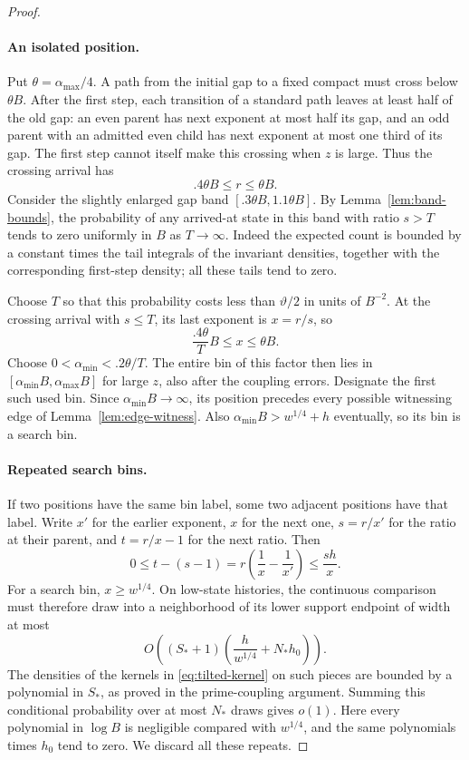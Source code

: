 \begin{proof}
\paragraph{An isolated position.}
Put $\theta=\alpha_{\max}/4$.  A path from the initial gap to a
fixed compact must cross below $\theta B$.  After the first step,
each transition of a standard path leaves at least half of the
old gap: an even parent has next exponent at most half its gap,
and an odd parent with an admitted even child has next exponent
at most one third of its gap.  The first step cannot itself make
this crossing when $z$ is large.  Thus the crossing arrival has
\[
 .4\theta B\le r\le\theta B.
\]
Consider the slightly enlarged gap band
$[.3\theta B,1.1\theta B]$.  By Lemma~\ref{lem:band-bounds}, the
probability of any arrived-at state in this band with ratio
$s>T$ tends to zero uniformly in $B$ as $T\to\infty$.
Indeed the expected count is bounded by a constant times the
tail integrals of the invariant densities, together with the
corresponding first-step density; all these tails tend to zero.

Choose $T$ so that this probability costs less than $\vartheta/2$ in
units of $B^{-2}$.  At the crossing arrival with $s\le T$, its last
exponent is $x=r/s$, so
\[
 \frac{.4\theta}{T}B\le x\le\theta B.
\]
Choose $0<\alpha_{\min}<.2\theta/T$.  The entire bin of this
factor then lies in $[\alpha_{\min}B,\alpha_{\max}B]$ for large
$z$, also after the coupling errors.  Designate the first such
used bin.  Since $\alpha_{\min}B\to\infty$, its position precedes
every possible witnessing edge of
Lemma~\ref{lem:edge-witness}.  Also
$\alpha_{\min}B>w^{1/4}+h$ eventually, so its bin is a search bin.

\paragraph{Repeated search bins.}
If two positions have the same bin label, some two adjacent
positions have that label.  Write $x'$ for the earlier exponent,
$x$ for the next one, $s=r/x'$ for the ratio at their parent, and
$t=r/x-1$ for the next ratio.  Then
\begin{equation}\label{eq:boxes-repeat-width}
 0\le t-(s-1)=r\left(\frac1x-\frac1{x'}\right)
       \le\frac{s h}{x}.
\end{equation}
For a search bin, $x\ge w^{1/4}$.  On low-state histories, the
continuous comparison must therefore draw into a neighborhood of
its lower support endpoint of width at most
\[
 O\left((S_*+1)
       \left(\frac{h}{w^{1/4}}+N_*h_0\right)\right).
\]
The densities of the kernels in \eqref{eq:tilted-kernel} on such
pieces are bounded by a polynomial in $S_*$, as proved in the
prime-coupling argument.  Summing this conditional probability
over at most $N_*$ draws gives $o(1)$.  Here every polynomial in
$\log B$ is negligible compared with $w^{1/4}$, and the same
polynomials times $h_0$ tend to zero.  We discard all these repeats.


\end{proof}
